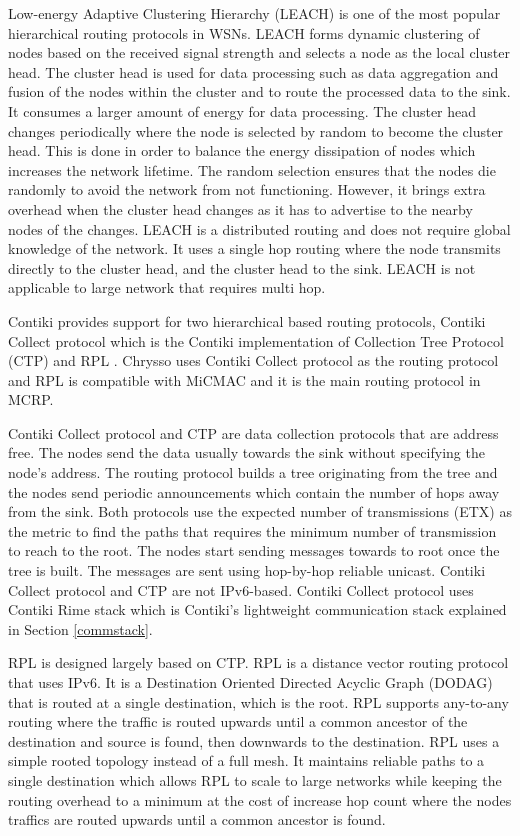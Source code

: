 Low-energy Adaptive Clustering Hierarchy (LEACH) is one of the most popular hierarchical routing protocols in WSNs. LEACH forms dynamic clustering of nodes based on the received signal strength and selects a node as the local cluster head. The cluster head is used for data processing such as data aggregation and fusion of the nodes within the cluster and to route the processed data to the sink. It consumes a larger amount of energy for data processing. The cluster head changes periodically where the node is selected by random to become the cluster head. This is done in order to balance the energy dissipation of nodes which increases the network lifetime. The random selection ensures that the nodes die randomly to avoid the network from not functioning. However, it brings extra overhead when the cluster head changes as it has to advertise to the nearby nodes of the changes. LEACH is a distributed routing and does not require global knowledge of the network. It uses a single hop routing where the node transmits directly to the cluster head, and the cluster head to the sink. LEACH is not applicable to large network that requires multi hop.

Contiki provides support for two hierarchical based routing protocols, Contiki Collect protocol which is the Contiki implementation of Collection Tree Protocol (CTP) \cite{ctp} and RPL \cite{winter2012rpl}. Chrysso uses Contiki Collect protocol as the routing protocol and RPL is compatible with MiCMAC and it is the main routing protocol in MCRP.

Contiki Collect protocol and CTP are data collection protocols that are address free. The nodes send the data usually towards the sink without specifying the node's address. The routing protocol builds a tree originating from the tree and the nodes send periodic announcements which contain the number of hops away from the sink. Both protocols use the expected number of transmissions (ETX) as the metric to find the paths that requires the minimum number of transmission to reach to the root. The nodes start sending messages towards to root once the tree is built. The messages are sent using hop-by-hop reliable unicast.
Contiki Collect protocol and CTP are not IPv6-based. Contiki Collect protocol uses Contiki Rime stack which is Contiki's lightweight communication stack explained in Section \ref{commstack}. 

RPL is designed largely based on CTP. RPL is a distance vector routing protocol that uses IPv6. It is a Destination Oriented Directed Acyclic Graph (DODAG) that is routed at a single destination, which is the root. RPL supports any-to-any routing where the traffic is routed upwards until a common ancestor of the destination and source is found, then downwards to the destination. RPL uses a simple rooted topology instead of a full mesh. It maintains reliable paths to a single destination which allows RPL to scale to large networks while keeping the routing overhead to a minimum at the cost of increase hop count where the nodes traffics are routed upwards until a common ancestor is found. 

